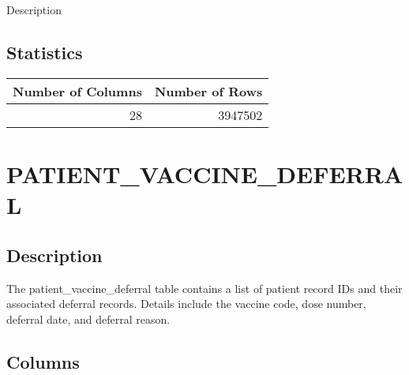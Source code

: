 \documentclass[
  letterpaper,
  DIV=11,
  numbers=noendperiod]{scrreprt}
\begin{document}
Description

\hypertarget{statistics-30}{%
\section*{Statistics}\label{statistics-30}}

\begin{longtable}{rr}
\toprule
Number of Columns & Number of Rows \\ 
\midrule
28 & 3947502 \\ 
\bottomrule
\end{longtable}

\hypertarget{patient_vaccine_deferral}{%
\chapter*{PATIENT\_VACCINE\_DEFERRAL}\label{patient_vaccine_deferral}}

\hypertarget{description-31}{%
\section*{Description}\label{description-31}}

The patient\_vaccine\_deferral table contains a list of patient record
IDs and their associated deferral records. Details include the vaccine
code, dose number, deferral date, and deferral reason.

\hypertarget{columns-31}{%
\section*{Columns}\label{columns-31}}
\end{document}
